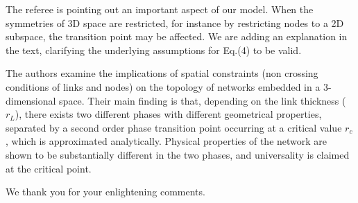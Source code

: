 \documentclass[11pt]{article}
\begin{document}
\begin{response}
The referee is pointing out an important aspect of our model. 
When the symmetries of 3D space are restricted, for instance by restricting nodes to a 2D subspace, the transition point may be affected. We are adding an explanation in the text, clarifying the underlying assumptions for Eq.(4) to be valid.



\end{response}

\newpage

\begin{response}{The authors examine the implications of spatial constraints (non crossing conditions of links and nodes) on the topology of networks embedded in a 3-dimensional space. 
Their main finding is that, depending on the link thickness ($r_L$), there exists two different phases with different geometrical properties, separated by a second order phase transition point occurring at a critical value $r_c$, which is approximated analytically. 
Physical properties of the network are shown to be substantially different in the two phases, and universality is claimed at the critical point. 
}

We thank you for your enlightening comments. 
\end{response}
\end{document}
